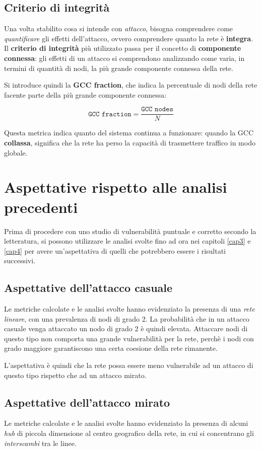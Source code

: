 \subsection{Criterio di integrità}
Una volta stabilito cosa si intende con \textit{attacco}, bisogna comprendere come \textit{quantificare} gli effetti dell'attacco, ovvero comprendere quanto la rete è \textbf{integra}. \\
Il \textbf{criterio di integrità} più utilizzato \cite{vonFerber2012LondonParis} passa per il concetto di \textbf{componente connessa}: gli effetti di un attacco si comprendono analizzando come varia, in termini di quantità di nodi, la più grande componente connessa della rete.

Si introduce quindi la \textbf{GCC fraction}, che indica la percentuale di nodi della rete facente parte della più grande componente connessa:

$$
    \texttt{GCC fraction} = \frac{\texttt{GCC nodes} }{N}
$$

Questa metrica indica quanto del sistema continua a funzionare: quando la GCC \textbf{collassa}, significa che la rete ha perso la capacità di trasmettere traffico in modo globale.

\section{Aspettative rispetto alle analisi precedenti}
Prima di procedere con uno studio di vulnerabilità puntuale e corretto secondo la letteratura, si possono utilizzare le analisi svolte fino ad ora nei capitoli \ref{cap3} e \ref{cap4} per avere un'aspettativa di quelli che potrebbero essere i risultati successivi.

\subsection{Aspettative dell'attacco casuale}
Le metriche calcolate e le analisi svolte hanno evidenziato la presenza di una \textit{rete lineare}, con una prevalenza di nodi di grado 2. La probabilità che in un attacco casuale venga attaccato un nodo di grado 2 è quindi elevata. Attaccare nodi di questo tipo non comporta una grande vulnerabilità per la rete, perchè i nodi con grado maggiore garantiscono una certa coesione della rete rimanente. 

L'aspettativa è quindi che la rete possa essere meno vulnerabile ad un attacco di questo tipo rispetto che ad un attacco mirato.

\subsection{Aspettative dell'attacco mirato}
Le metriche calcolate e le analisi svolte hanno evidenziato la presenza di alcuni \textit{hub} di piccola dimensione al centro geografico della rete, in cui si concentrano gli \textit{interscambi} tra le linee. 

